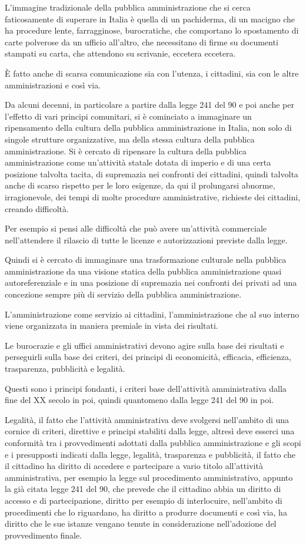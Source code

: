 L'immagine tradizionale della pubblica amministrazione che si cerca faticosamente di superare in Italia  è quella di un pachiderma, di un macigno che ha procedure lente, farragginose, burocratiche, che comportano lo spostamento di carte polverose da un ufficio all'altro, che necessitano di firme su documenti stampati su carta, che attendono su scrivanie, eccetera eccetera.

È fatto anche di scarsa comunicazione sia con l'utenza, i cittadini, sia con le altre amministrazioni e così via.

Da alcuni decenni, in particolare a partire dalla legge 241 del 90 e poi anche per l'effetto di vari principi comunitari, si è cominciato a immaginare un ripensamento della cultura della pubblica amministrazione in Italia, non solo di singole strutture organizzative, ma della stessa cultura della pubblica amministrazione. Si è cercato di ripensare la cultura della pubblica amministrazione come un'attività statale dotata di imperio e di una certa posizione talvolta tacita, di supremazia nei confronti dei cittadini, quindi talvolta anche di scarso rispetto per le loro esigenze, da qui il prolungarsi abnorme, irragionevole, dei tempi di molte procedure amministrative, richieste dei cittadini, creando difficoltà.

Per esempio si pensi alle difficoltà che può avere un'attività commerciale nell'attendere il rilascio di tutte le licenze e autorizzazioni previste dalla legge.

Quindi si è cercato di immaginare una trasformazione culturale nella pubblica amministrazione da una visione statica della pubblica amministrazione quasi autoreferenziale e in una posizione di supremazia nei confronti dei privati ad una concezione sempre più di servizio della pubblica amministrazione.

L'amministrazione come servizio ai cittadini, l'amministrazione che al suo interno viene organizzata in maniera premiale in vista dei risultati.

Le burocrazie e gli uffici amministrativi devono agire sulla base dei risultati e perseguirli sulla base dei criteri, dei principi di economicità, efficacia, efficienza, trasparenza, pubblicità e legalità.

Questi sono i principi fondanti, i criteri base dell'attività amministrativa dalla fine del XX secolo in poi, quindi quantomeno dalla legge 241 del 90 in poi.

Legalità, il fatto che l'attività amministrativa deve svolgersi nell'ambito di una cornice di criteri, direttive e principi stabiliti dalla legge, altresì deve esserci una conformità tra i provvedimenti adottati dalla pubblica amministrazione e gli scopi e i presupposti indicati dalla legge, legalità, trasparenza e pubblicità, il fatto che il cittadino ha diritto di accedere e partecipare a vario titolo all'attività amministrativa, per esempio la legge sul procedimento amministrativo, appunto la già citata legge 241 del 90, che prevede che il cittadino abbia un diritto di accesso e di partecipazione, diritto per esempio di interlocuire, nell'ambito di procedimenti che lo riguardano, ha diritto a produrre documenti e così via, ha diritto che le sue istanze vengano tenute in considerazione nell'adozione del provvedimento finale.

